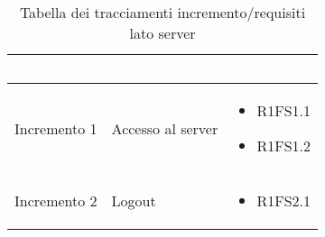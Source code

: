 {
\renewcommand{\arraystretch}{2}
\centering
	
\begin{longtable}{C{4cm} C{6cm} C{4cm}}
\caption{Tabella dei tracciamenti incremento/requisiti lato server}\\

\textcolor{white}{\textbf{Incremento}} &
\textcolor{white}{\textbf{Descrizione}} & 
\textcolor{white}{\textbf{Requisiti}}\\
\endfirsthead	
\endhead

Incremento 1 & Accesso al server & \begin{itemize}
    \item[ ] R1FS1.1
    \item[ ] R1FS1.2 
\end{itemize}  \\

Incremento 2 & Logout & \begin{itemize}
    \item[ ] R1FS2.1
\end{itemize} \\

\end{longtable}
}